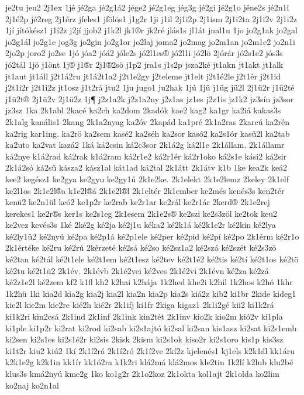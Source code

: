 {je2tu
jeu2
2j1ex
1jé
jé2ga
jé2g1á2
jége2
jé2g1eg
jég3g
jé2gi
jé2g1o
jéne2s
jé2n1i
2j1é2p
jé2reg
2j1érz
jfeles1
jfölös1
j1g2r
1ji
j1il
2j1i2p
2j1ism
2j1i2ta
2j1i2v
2j1i2z
1jí
jítókész1
j1í2z
j2jí
jjob2
j1k2l
jk1®r
jk2ré
jlás1s
jl1át
jnal1u
1jo
jo2g1ak
jo2gal
jo2g1ál
jo2g1e
jog3g
jo2gin
jo2g1or
jo2laj
joma2
jo2mag
jo2m1an
jo2m1e2
jo2n1i
2jo2p
joro2
jo2se
1jó
jóa2
jóá2
jóle2s
jó2l1es®
jó2l1i
jó2lö
2jórár
jó2s1e2
jós3s
jó2tál
1jö
j1önt
1j®
j1®r
2j1®2sö
j1p2
jra1s
j1s2p
jsza2ké
jt1akn
jt1akt
jt1alk
jt1aut
jt1áll
j2t1á2ru
jt1á2t1a2
j2t1e2gy
j2teleme
jt1elt
j2t1é2le
j2t1ér
j2t1id
j2t1i2r
j2t1i2z
jt1osz
j1t2rá
jtu2
1ju
jugo1
ju2hak
1jú
1jü
j1üg
jü2l
2j1ü2r
j1ü2té
j1ü2t®
2j1ü2v
2j1ü2z
1j¶
j2z1a2k
j2z1a2ny
j2z1as
jz1es
j2z1is
jz1k2
jz3sín
jz3sor
jz3sz
1ka
2k1abl
2kacé
ka2ch
ka2dom
2kadók
kae2
kag2
ka1gr
ka2iá
kakas3s
2k1alg
kanális1
2kang
2k1a2nyag
ka2óv
2kapád
ka1pré
2k1a2ras
2karcú
ka2rén
ka2rig
kar1ing.
ka2rö
ka2sem
kasé2
ka2séh
ka2sor
kasó2
ka2s1ór
kasü2l
ka2tab
ka2uto
ka2vat
kazá2
1ká
ká2csin
ká2c3sor
2k1á2g
ká2l1e
2k1állam.
2k1államr
ká2nye
k1á2rad
ká2rak
k1á2ram
ká2r1e2
ká2r1ér
ká2r1oko
ká2s1e
kási2
ká2sir
2k1á2só
ká2sü
kásza2
kász1al
kát1ad
ká2tal
2k1átt
2k1átv
k1b
1ke
kea2k
keá2
kee2
kegész1
ke2gya
ke2gyu
ke2gy1ú
2k1e2ke.
2k1elekt
2k1e2lemz
2keley
2k1elf
ke2l1os
2k1e2l®a
k1e2l®á
2k1e2l®l
2k1eltér
2k1ember
ke2més
kenés3s
ken2tér
kenü2
ke2n1ül
keó2
ke1p2r
ke2rab
ke2r1ar
ke2rál
ke2r1ár
2kerd®
2k1e2rej
kerekes1
ke2r®s
ker1s
ke2s1eg
2k1esem
2k1e2s®
ke2szi
ke2s3zöl
ke2tok
keu2
ke2vez
kevés3s
1ké
2ké2g
ké2ja
ké2j1u
kéka2
ké2k1á
ké2k1e2r
ké2kin
ké2lya
ké2ly1ü2
ké2nyú
ké2pa
ké2p1á
ké2p1ele
ké2per
ké2pid
ké2pí
ké2po
2k1érm
ké2r1o
2k1értéke
ké2ru
ké2rú
2kérzeté
ké2sá
ké2so
ké2sz1a2
ké2szá
ké2szét
ké2s3zö
ké2tan
ké2tál
ké2t1ele
ké2t1em
ké2t1esz
ké2tev
ké2t1é2
ké2tis
ké2tí
ké2t1os
ké2tö
ké2tu
ké2t1ü2
2k1év.
2k1évb
2k1é2vei
ké2ves
2k1é2vi
2k1évn
ké2za
ké2zá
ké2z1e2l
ké2zem
kf2
k1fl
kh2
k2hai
k2hája
1k2hed
khe2i
k2hil
1k2hos
k2hó
1khr
1k2hü
1ki
kia2d
kia2g
kia2j
kia2l
kia2n
kia2p
kia2s
kiá2z
kib2
ki1br
2kide
kideg1
kie2l
kie2m
kie2re
kié2h
kié2r
2k1ifj
ki1fr
2kiga
kigaz1
2k1i2gé
kii2
ki1k2rá
ki1k2ri
kin2csá
2k1ind
2k1inf
2k1ink
kin2tét
2k1inv
kio2k
kio2m
kió2v
ki1pla
ki1ple
ki1p2r
ki2rat
ki2rod
ki2sab
ki2s1ajtó
ki2sal
ki2san
kis1asz
ki2sat
ki2s1emb
ki2sen
ki2s1es
ki2s1é2r
ki2sis
2kisk
2kism
ki2s1ok
kiso2r
ki2s1oro
kis1p
kis3sz
ki1t2r
kiu2
kiú2
1kí
2k1í2rá
2k1í2ró
2k1í2ve
2kí2z
kjelenés1
kj1els
k2k1ál
kk1áru
k2k1e2g
k2k1in
kk1ír
kk1ó2ra
k1k2ri
klá2má
klá2mos
kle2tin
1k2lí
k2lub
klu2bé
klus3s
kmá2nyú
kme2g
1ko
ko1g2r
2k1o2koz
2k1okta
kol1ajt
2k1olda
ko2lim
ko2naj
ko2n1al
}
